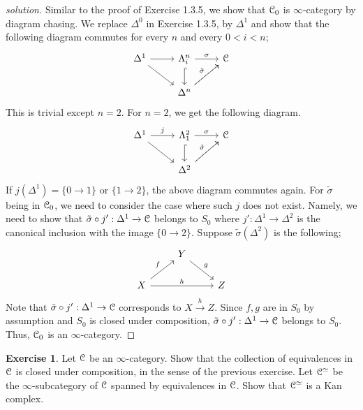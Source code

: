 \documentclass[10pt,a4paper,reqno,oneside]{book} %
\theoremstyle{plain}
\theoremstyle{definition}
\newtheorem{exercise}[thm]{Exercise}
\theoremstyle{remark}
\numberwithin{equation}{section}
\begin{document}
\ifpersonal
\begin{proof}[solution]
    Similar to the proof of Exercise 1.3.5, we show that $\mathcal C_0$ is $\infty$-category by diagram chasing. We replace $\Delta^0$ in Exercise 1.3.5, by $\Delta^1$ and show that the following diagram commutes for every $n$ and every $0<i<n$;
    \[ \begin{tikzcd}
		\Delta^1 \arrow{r} \arrow{dr} & \Lambda^n_i \arrow{r}{\sigma} \arrow[hook]{d} & \cC \\
		{} & \Delta^n \arrow[dashed]{ur}{\tilde{\sigma}} \arrow{ur} & {} 
	\end{tikzcd} \]
	This is trivial except $n=2$. For $n=2$, we get the following diagram.
	\[ \begin{tikzcd}
		\Delta^1 \arrow{r}{j} \arrow{dr} & \Lambda^2_1 \arrow{r}{\sigma} \arrow[hook]{d} & \cC \\
		{} & \Delta^2 \arrow[dashed]{ur}{\tilde{\sigma}} \arrow{ur} & {} 
	\end{tikzcd} \]
	If $j(\Delta^1)=\{0 \to 1\}$ or $\{1 \to 2\}$, the above diagram commutes again. For $\tilde{\sigma}$ being in $\mathcal C_0$, we need to consider the case where such $j$ does not exist. Namely, we need to show that $\tilde{\sigma} \circ j':\Delta^1 \to \mathcal C$ belongs to $S_0$ where $j':\Delta^1 \to \Delta^2$ is the canonical inclusion with the image $\{0 \to 2\}$. Suppose $\tilde{\sigma}(\Delta^2)$ is the following;
	\[ \begin{tikzcd}
	{} & Y \arrow{dr}{g} \\
	X \arrow{ur}{f} \arrow{rr}{h} & & Z
	\end{tikzcd} \]
	Note that $\tilde{\sigma} \circ j':\Delta^1 \to \mathcal C$ corresponds to $X \xrightarrow{h} Z$. Since $f, g$ are in $S_0$ by assumption and $S_0$ is closed under composition, $\tilde{\sigma} \circ j':\Delta^1 \to \mathcal C$ belongs to $S_0$. Thus, $\mathcal C_0$ is an $\infty$-category. 
\end{proof}
\fi

\begin{exercise}\label{ex:Kan_complex}
	Let $\mathcal C$ be an $\infty$-category. Show that the collection of equivalences in $\mathcal C$ is closed under composition, in the sense of the previous exercise.
	Let $\mathcal C^{\simeq}$ be the $\infty$-subcategory of $\mathcal C$ spanned by equivalences in $\mathcal C$.
	Show that $\mathcal C^{\simeq}$ is a Kan complex.
\end{exercise}
\end{document}
